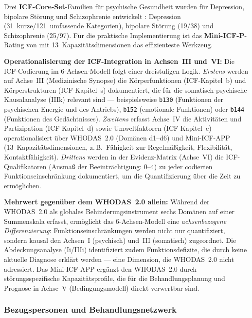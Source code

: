 \documentclass[11pt,a4paper]{article}
\begin{document}
Drei \textbf{ICF-Core-Set}-Familien f\"ur psychische Gesundheit wurden f\"ur Depression, bipolare St\"orung und Schizophrenie entwickelt \citep{Cieza2004Depression, AyusoMateos2013Bipolar, GomezBenito2018Schizophrenia}: Depression (31~kurze/121~umfassende Kategorien), bipolare St\"orung (19/38) und Schizophrenie (25/97). F\"ur die praktische Implementierung ist das \textbf{Mini-ICF-P}-Rating von \citet{LindenBaron2005} mit 13~Kapazit\"atsdimensionen das effizienteste Werkzeug.

\textbf{Operationalisierung der ICF-Integration in Achsen~III und~VI:} Die ICF-Codierung im 6-Achsen-Modell folgt einer dreistufigen Logik. \textit{Erstens} werden auf Achse~III (Medizinische Synopse) die K\"orperfunktionen (ICF-Kapitel~b) und K\"orperstrukturen (ICF-Kapitel~s) dokumentiert, die f\"ur die somatisch-psychische Kausalanalyse (IIIk) relevant sind --- beispielsweise \texttt{b130} (Funktionen der psychischen Energie und des Antriebs), \texttt{b152} (emotionale Funktionen) oder \texttt{b144} (Funktionen des Ged\"achtnisses). \textit{Zweitens} erfasst Achse~IV die Aktivit\"aten und Partizipation (ICF-Kapitel~d) sowie Umweltfaktoren (ICF-Kapitel~e) --- operationalisiert \"uber WHODAS~2.0 (Dom\"anen d1--d6) und Mini-ICF-APP (13~Kapazit\"atsdimensionen, z.\,B.\ F\"ahigkeit zur Regelm\"a\ss{}igkeit, Flexibilit\"at, Kontaktf\"ahigkeit). \textit{Drittens} werden in der Evidenz-Matrix (Achse~VI) die ICF-Qualifikatoren (Ausma\ss{} der Beeintr\"achtigung: 0--4) zu jeder codierten Funktionseinschr\"ankung dokumentiert, um die Quantifizierung \"uber die Zeit zu erm\"oglichen.

\textbf{Mehrwert gegen\"uber dem WHODAS~2.0 allein:} W\"ahrend der WHODAS~2.0 als globales Behinderungsinstrument sechs Dom\"anen auf einer Summenskala erfasst, erm\"oglicht das 6-Achsen-Modell eine \textit{achsenbezogene Differenzierung}: Funktionseinschr\"ankungen werden nicht nur quantifiziert, sondern kausal den Achsen~I (psychisch) und~III (somatisch) zugeordnet. Die Abdeckungsanalyse (Ii/IIIi) identifiziert zudem Funktionsdefizite, die durch keine aktuelle Diagnose erkl\"art werden --- eine Dimension, die WHODAS~2.0 nicht adressiert. Das Mini-ICF-APP erg\"anzt den WHODAS~2.0 durch st\"orungsspezifische Kapazit\"atsprofile, die f\"ur die Behandlungsplanung und Prognose in Achse~V (Bedingungsmodell) direkt verwertbar sind.

\subsubsection{Bezugspersonen und Behandlungsnetzwerk}
\end{document}
